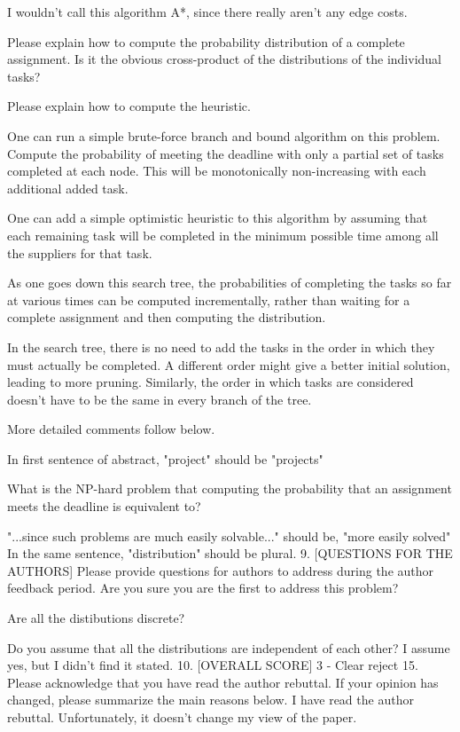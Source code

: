 I wouldn't call this algorithm A*, since there really aren't any edge costs.

Please explain how to compute the probability distribution of a complete assignment. Is it the obvious cross-product of the distributions of the individual tasks?

Please explain how to compute the heuristic.

One can run a simple brute-force branch and bound algorithm on this problem. Compute the probability of meeting the deadline with only a partial set of tasks completed at each node. This will be monotonically non-increasing with each additional added task.

One can add a simple optimistic heuristic to this algorithm by assuming that each remaining task will be completed in the minimum possible time among all the suppliers for that task.

As one goes down this search tree, the probabilities of completing the tasks so far at various times can be computed incrementally, rather than waiting for a complete assignment and then computing the distribution.

In the search tree, there is no need to add the tasks in the order in which they must actually be completed. A different order might give a better initial solution, leading to more pruning. Similarly, the order in which tasks are considered doesn't have to be the same in every branch of the tree.

More detailed comments follow below.

In first sentence of abstract, "project" should be "projects"

What is the NP-hard problem that computing the probability that an assignment meets the deadline is equivalent to?

"...since such problems are much easily solvable..." should be, "more easily solved" In the same sentence, "distribution" should be plural.
9. [QUESTIONS FOR THE AUTHORS] Please provide questions for authors to address during the author feedback period.
Are you sure you are the first to address this problem?

Are all the distibutions discrete?

Do you assume that all the distributions are independent of each other? I assume yes, but I didn't find it stated.
10. [OVERALL SCORE]
3 - Clear reject
15. Please acknowledge that you have read the author rebuttal. If your opinion has changed, please summarize the main reasons below.
I have read the author rebuttal. Unfortunately, it doesn't change my view of the paper.


